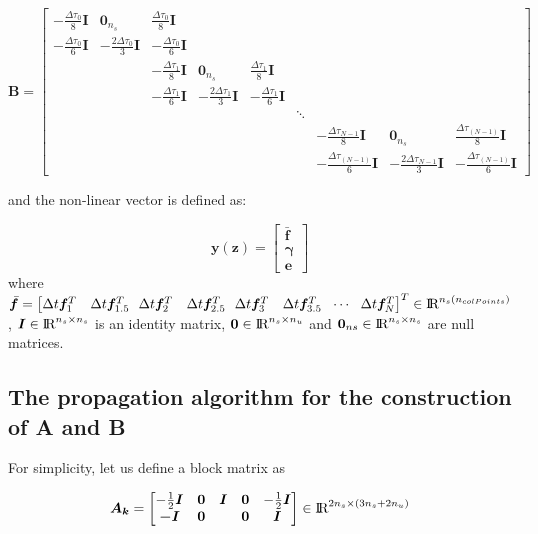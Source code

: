 \documentclass[12pt]{article}
\newcommand{\real}{\mbox{\rm I$\!$R}}
\begin{document}
\begin{equation}
\bm{B}=\begin{bmatrix}
 -\frac{\Delta \tau_0}{8}\bm{I}& \bm{0}_{n_s} & \frac{\Delta \tau_0}{8}\bm{I} &  &  &  &  &  & \\ 
 -\frac{\Delta \tau_0}{6}\bm{I}& -\frac{2\Delta \tau_0}{3}\bm{I} & -\frac{\Delta \tau_0}{6}\bm{I} &  &  &  &  &  & \\ 
 &  & -\frac{\Delta \tau_1}{8}\bm{I} & \bm{0}_{n_s} & \frac{\Delta \tau_1}{8}\bm{I} &  &  &  & \\ 
 &  & -\frac{\Delta \tau_1}{6}\bm{I} & -\frac{2\Delta \tau_1}{3}\bm{I} & -\frac{\Delta \tau_1}{6}\bm{I} &  &  &  & \\ 
 &  &  &  &  & \ddots &  &  & \\ 
 &  &  &  &  &  & -\frac{\Delta \tau_{N-1}}{8}\bm{I} & \bm{0}_{n_s} & \frac{\Delta \tau_{(N-1)}}{8}\bm{I}\\ 
 &  &  &  &  &  & -\frac{\Delta \tau_{(N-1)}}{6}\bm{I} & -\frac{2\Delta \tau_{N-1}}{3}\bm{I} & -\frac{\Delta \tau_{(N-1)}}{6}\bm{I}
\end{bmatrix} \nonumber
\end{equation}

and the non-linear vector is defined as:

\begin{equation}
\bm{y}(\bm{z})=\begin{bmatrix}
\bar{\bm{f}}\\
\bm{\gamma}\\
\bm{e}
\end{bmatrix} 
\end{equation}
%
where $\bar{\bm{f}} = \left[ \Delta t\bm{f}_{1}^T \ \ \ \Delta t\bm{f}_{1.5}^T \ \ \Delta t\bm{f}_{2}^T \ \ \ \Delta t\bm{f}_{2.5}^T \ \ \Delta t\bm{f}_{3}^T \ \ \ \Delta t\bm{f}_{3.5}^T \ \ \cdots \ \ \Delta t\bm{f}_{N}^T \right]^T \in \real^{n_s(n_{colPoints})}$, $\bm{I} \in \real^{n_s \times n_s}$ is an identity matrix, $\bm{0} \in \real^{n_s \times n_u}$ and $\bm{0}_{ns} \in \real^{n_s \times n_s}$ are null matrices. 

\newpage

\subsection{The propagation algorithm for the construction of A and B}

For simplicity, let us define a block matrix as


\begin{eqnarray}
\bm{A_k}= \begin{bmatrix}
-\frac{1}{2}\bm{I} &\bm{0} &\bm{I} &\bm{0} &-\frac{1}{2}\bm{I}\\
 \bm{-I} &\bm{0} & & \bm{0} &\bm{I} \\
\end{bmatrix} \in \real^{2n_s \times (3n_s + 2n_u)}
\end{eqnarray}
\end{document}
